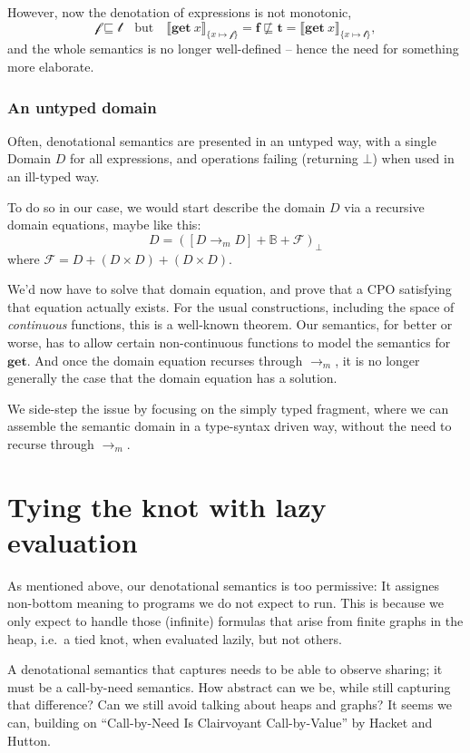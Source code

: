 \documentclass[manuscript,screen,acmsmall,nonacm]{acmart}
\newcommand{\syntax}[1]{\mathbf{#1}}
\newcommand{\sGet}{\syntax{get}}
\newcommand{\dBool}{\mathbb B}
\newcommand{\dFalse}{\mathbf{f}}
\newcommand{\dTrue}{\mathbf{t}}
\newcommand{\rTrue}{\mathscr{t}}
\newcommand{\rFalse}{\mathscr{f}}
\newcommand{\dRBool}{\mathcal F}
\newcommand{\D}[1]{\llbracket #1 \rrbracket}
\begin{document}
However, now the denotation of expressions is not monotonic,
\[
\rFalse \sqsubseteq \rTrue
\quad\text{but}\quad
\D{\sGet~x}_{\{x \mapsto \rFalse\}} = \dFalse
\not\sqsubseteq
\dTrue = \D{\sGet~x}_{\{x \mapsto \rTrue\}},
\]
and the whole semantics is no longer well-defined -- hence the need for something more elaborate.

\subsubsection{An untyped domain}

Often, denotational semantics are presented in an untyped way, with a single Domain $D$ for all expressions, and operations failing (returning $\bot$) when used in an ill-typed way.

To do so in our case, we would start describe the domain $D$ via a recursive domain equations, maybe like this:
\[
D = ([D \to_m D] + \dBool + \dRBool)_\bot
\]
where $\dRBool = D + (D \times D) + (D \times D)$.

We'd now have to solve that domain equation, and prove that a CPO satisfying that equation actually exists. For the usual constructions, including the space of \emph{continuous} functions, this is a well-known theorem. Our semantics, for better or worse, has to allow certain non-continuous functions to model the semantics for $\sGet$. And once the domain equation recurses through $\to_m$, it is no longer generally the case that the domain equation has a solution.

We side-step the issue by focusing on the simply typed fragment, where we can assemble the semantic domain in a type-syntax driven way, without the need to recurse through $\to_m$.

\section{Tying the knot with lazy evaluation}

As mentioned above, our denotational semantics is too permissive: It assignes non-bottom meaning to programs we do not expect to run. This is because we only expect to handle those (infinite) formulas that arise from finite graphs in the heap, i.e.\ a tied knot, when evaluated lazily, but not others.

A denotational semantics that captures needs to be able to observe sharing; it must be a call-by-need semantics. How abstract can we be, while still capturing that difference? Can we still avoid talking about heaps and graphs? It seems we can, building on “Call-by-Need Is Clairvoyant Call-by-Value” by Hacket and Hutton.
\end{document}
